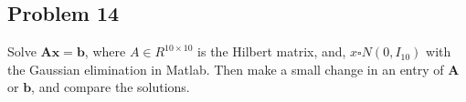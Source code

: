 \subsection{Problem 14}

 Solve $\mathbf{Ax=b}$, where $A \in R ^ {10 \times 10}$ is  the  Hilbert  matrix, and,  $x \square N(0, I_{10})$ with the Gaussian elimination in Matlab. Then make a small change in an entry of $\mathbf{A}$ or $\mathbf{b}$, and compare the solutions.
  